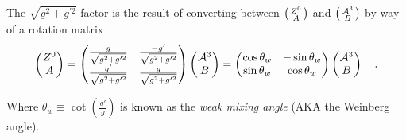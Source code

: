     The $\sqrt{g^2 + g^{\prime 2}}$ factor is the result of converting between
        $\big(\begin{smallmatrix} Z^0 \\ A \end{smallmatrix}\big)$ and $\big(\begin{smallmatrix} \mathcal{A}^3 \\ B \end{smallmatrix}\big)$ by way of a rotation matrix
    \begin{equation} \begin{split}
        \begin{pmatrix} Z^0 \\ A \end{pmatrix} =
        \begin{pmatrix}
            \frac{g}{\sqrt{g^2 + g^{\prime 2}}} & \frac{-g'}{\sqrt{g^2 + g^{\prime 2}}} \\
            \frac{g'}{\sqrt{g^2 + g^{\prime 2}}} & \frac{g}{\sqrt{g^2 + g^{\prime 2}}}
        \end{pmatrix} \begin{pmatrix} \mathcal{A}^3 \\ B \end{pmatrix} = 
        \begin{pmatrix}
            \cos\theta_w & -\sin\theta_w \\
            \sin\theta_w & \cos\theta_w
        \end{pmatrix} \begin{pmatrix} \mathcal{A}^3 \\ B \end{pmatrix}
        \quad.
    \end{split} \end{equation}

    Where $\theta_w \equiv \cot(\frac{g'}{g})$ is known as the \textit{weak mixing angle} (AKA the Weinberg angle).

